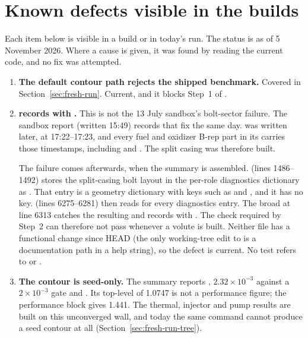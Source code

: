\section{Known defects visible in the builds}\label{sec:build-defects}

Each item below is visible in a build or in today's run. The status is as of 5 November 2026. Where a cause is given, it was found by reading the current code, and no fix was attempted.

\begin{enumerate}[leftmargin=1.9em]
\item \textbf{The default contour path rejects the shipped benchmark.} Covered in Section~\ref{sec:fresh-run}. Current, and it blocks Step~1 of .

\item \textbf{ records   with  .} This is not the 13 July sandbox's bolt-sector failure. The sandbox report (written 15:49) records that fix the same day.  was written later, at 17:22--17:23, and every fuel and oxidizer B-rep part in its  carries those timestamps, including  and . The split casing was therefore built.

The failure comes afterwards, when the summary is assembled.  (lines 1486--1492) stores the split-casing bolt layout in the per-role diagnostics dictionary as . That entry is a geometry dictionary with keys such as  and , and it has no  key.  (lines 6275--6281) then reads  for every diagnostics entry. The broad  at line 6313 catches the resulting  and records  with  . The  check required by  Step~2 can therefore not pass whenever a volute is built. Neither file has a functional change since HEAD (the only working-tree edit to  is a documentation path in a help string), so the defect is current. No test refers to  or .

\item \textbf{The  contour is seed-only.} The summary reports  ,  $2.32\times10^{-3}$ against a $2\times10^{-3}$ gate and  . Its top-level  of 1.0747 is not a performance figure; the performance block gives 1.441. The thermal, injector and pump results are built on this unconverged wall, and today the same command cannot produce a seed contour at all (Section~\ref{sec:fresh-run-tree}).


\end{enumerate}
